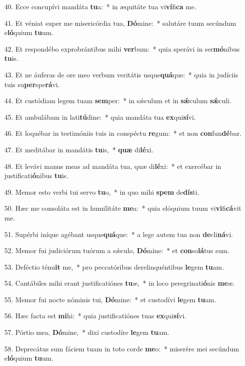 40. Ecce concupívi mandáta \textbf{tu}a:~*  in æquitáte tua vi\textbf{ví}fi\textbf{ca} me.\

41. Et véniat super me misericórdia tua, \textbf{Dó}mine:~*  salutáre tuum secúndum e\textbf{ló}quium \textbf{tu}um.\

42. Et respondébo exprobrántibus mihi \textbf{ver}bum:~*  quia sperávi in ser\textbf{mó}nibus \textbf{tu}is.\

43. Et ne áuferas de ore meo verbum veritátis usque\textbf{quá}que:~*  quia in judíciis tuis su\textbf{per}spe\textbf{rá}vi.\

44. Et custódiam legem tuam \textbf{sem}per:~*  in sǽculum et in \textbf{sǽ}culum \textbf{sǽ}culi.\

45. Et ambulábam in lati\textbf{tú}dine:~*  quia mandáta tua \textbf{ex}qui\textbf{sí}vi.\

46. Et loquébar in testimóniis tuis in conspéctu \textbf{re}gum:~*  et non \textbf{con}fun\textbf{dé}bar.\

47. Et meditábar in mandátis \textbf{tu}is,~*  \textbf{quæ} di\textbf{lé}xi.\

48. Et levávi manus meas ad mandáta tua, quæ di\textbf{lé}xi:~*  et exercébar in justificati\textbf{ó}nibus \textbf{tu}is.\

49. Memor esto verbi tui servo \textbf{tu}o,~*  in quo mihi \textbf{spem} de\textbf{dís}ti.\

50. Hæc me consoláta est in humilitáte \textbf{me}a:~*  quia elóquium tuum vi\textbf{vi}fi\textbf{cá}vit me.\

51. Supérbi iníque agébant usque\textbf{quá}que:~*  a lege autem tua non \textbf{de}cli\textbf{ná}vi.\

52. Memor fui judiciórum tuórum a sǽculo, \textbf{Dó}mine:~*  et \textbf{con}so\textbf{lá}tus sum.\

53. Deféctio ténu\textbf{it} me,~*  pro peccatóribus derelinquéntibus \textbf{le}gem \textbf{tu}am.\

54. Cantábiles mihi erant justificatiónes \textbf{tu}æ,~*  in loco peregrinati\textbf{ó}nis \textbf{me}æ.\

55. Memor fui nocte nóminis tui, \textbf{Dó}mine:~*  et custodívi \textbf{le}gem \textbf{tu}am.\

56. Hæc facta est \textbf{mi}hi:~*  quia justificatiónes tuas \textbf{ex}qui\textbf{sí}vi.\

57. Pórtio mea, \textbf{Dó}mine,~*  dixi custodíre \textbf{le}gem \textbf{tu}am.\

58. Deprecátus sum fáciem tuam in toto corde \textbf{me}o:~*  miserére mei secúndum e\textbf{ló}quium \textbf{tu}um.\

